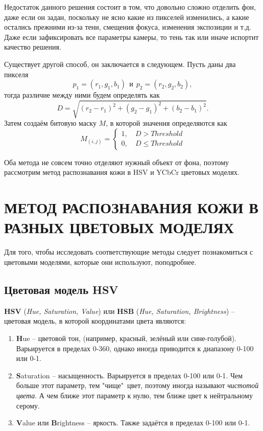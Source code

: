 Недостаток данного решения состоит в том, что довольно сложно отделить фон, даже если он задан,
поскольку не ясно какие из пикселей изменились, а какие остались прежними из-за тени, смещения
фокуса, изменения экспозиции и т.д. Даже если зафиксировать все параметры камеры, то тень так
или иначе испортит качество решения.

Существует другой способ, он заключается в следующем. 
Пусть даны два пикселя 
\begin{equation}
	p_1 = (r_1, g_1, b_1)~~и~~p_2 = (r_2, g_2, b_2),
	\label{pixels_bg}
\end{equation}
тогда различие между ними будем определять как
\begin{equation}
	D = \sqrt{(r_2 - r_1)^2 + (g_2 - g_1)^2 + (b_2 - b_1)^2}.
	\label{distance}
\end{equation}
Затем создаём битовую маску $M$, в которой значения определяются как
\begin{equation}
	M_{(i,j)}=\left\{\begin{aligned}
	1,~& D > Threshold\\
	0,~& D \leq Threshold
\end{aligned}\right. 
\label{bite-mask}
\end{equation}

Оба метода не совсем точно отделяют нужный объект от фона, поэтому 
рассмотрим метод распознавания кожи в HSV и YCbCr цветовых моделях.

\newpage

\section{\centering МЕТОД РАСПОЗНАВАНИЯ КОЖИ В РАЗНЫХ ЦВЕТОВЫХ МОДЕЛЯХ}

Для того, чтобы исследовать соответствующие методы следует познакомиться
 с цветовыми моделями, которые они используют, поподробнее.

\subsection{Цветовая модель HSV}

{\bf HSV} ({\it Hue, Saturation, Value}) или {\bf HSB} ({\it Hue, Saturation, Brightness}) --
цветовая модель, в которой координатами цвета являются:
\begin{enumerate}
	\item {\bf H}ue -- цветовой тон, (например, красный, зелёный или сине-голубой). Варьируется 
в пределах 0-360\textdegree, однако иногда приводится к диапазону 0-100 или 0-1.
	\item {\bf S}aturation -- насыщенность. Варьируется в пределах 0-100 или 0-1. Чем больше
этот параметр, тем "чище"\ цвет, поэтому иногда называют {\it чистотой цвета}. А чем ближе этот
параметр к нулю, тем ближе цвет к нейтральному серому.
	\item {\bf V}alue или {\bf B}rightness -- яркость. Также задаётся в пределах 0-100 или 0-1.
\end{enumerate}

